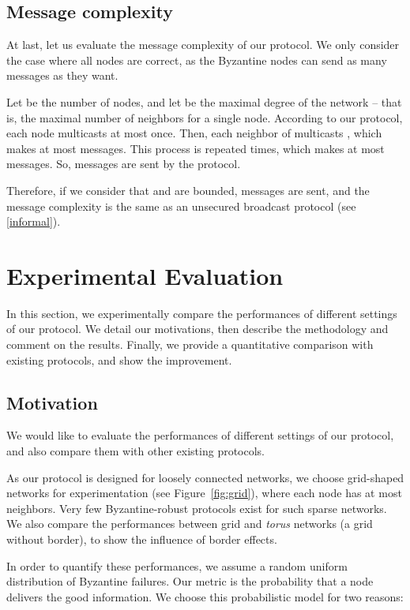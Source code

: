\documentclass[a4paper,11pt]{article}
\begin{document}
\subsection{Message complexity}
\label{messcomp}

At last, let us evaluate the message complexity of our protocol. We only consider the case where all nodes are correct, as the Byzantine nodes can send as many messages as they want.

Let  be the number of nodes, and let  be the maximal degree of the network -- that is, the maximal number of neighbors for a single node.
According to our protocol, each node  multicasts  at most once.
Then, each neighbor of  multicasts , which makes at most  messages. This process is repeated  times, which makes at most  messages.
So,  messages are sent by the protocol.

Therefore, if we consider that  and  are bounded,  messages are sent, and the message complexity is the same as an unsecured broadcast protocol (see \ref{informal}).

\section{Experimental Evaluation}
\label{sec_exp}

In this section, we experimentally compare the performances of different settings of our protocol. We detail our motivations, then describe the methodology and comment on the results. Finally, we provide a quantitative comparison with existing protocols, and show the improvement.

\subsection{Motivation}

We would like to evaluate the performances of different settings of our protocol, and also compare them with other existing protocols.

As our protocol is designed for loosely connected networks, we choose grid-shaped networks for experimentation (see Figure~\ref{fig:grid}), where each node has at most  neighbors. Very few Byzantine-robust protocols exist for such sparse networks.
We also compare the performances between grid and \emph{torus} networks (a grid without border), to show the influence of border effects.

In order to quantify these performances, we assume a random uniform distribution of Byzantine failures. Our metric is the probability that a node delivers the good information. We choose this probabilistic model for two reasons:
\end{document}
